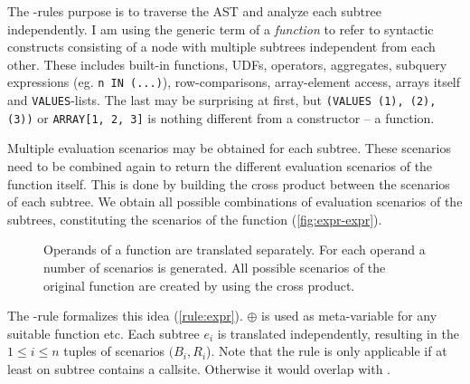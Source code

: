 The \REXPR-rules purpose is to traverse the AST and analyze each subtree independently. I am using the generic term of a \textit{function} to refer to syntactic constructs consisting of a node with multiple subtrees independent from each other. These includes built-in functions, UDFs, operators, aggregates, subquery expressions (eg. \texttt{n IN (...)}), row-comparisons, array-element access, arrays itself and \texttt{VALUES}-lists. The last may be surprising at first, but \texttt{(VALUES (1), (2), (3))} or \texttt{ARRAY[1, 2, 3]} is nothing different from a constructor -- a function.

Multiple evaluation scenarios may be obtained for each subtree. These scenarios need to be combined again to return the different evaluation scenarios of the function itself. This is done by building the cross product between the scenarios of each subtree. We obtain all possible combinations of evaluation scenarios of the subtrees, constituting the scenarios of the function (\autoref{fig:expr-expr}).

\begin{figure}[h]
    \centering
    
    \caption{Operands of a function are translated separately. For each operand a number of scenarios is generated. All possible scenarios of the original function are created by using the cross product.}
    \label{fig:expr-expr}
\end{figure}

\iffalse
$
\inferrule*[Right=(expr)]{
    \inferrule*[Left=(rec)]{ }{
        {\begin{minipage}[b]{15em}
        \texttt{(TRUE, fib($1 - 1)) ->}
        \texttt{({}, {(TRUE, fib($1 - 1))})}
        \end{minipage}}
    }\\
    \inferrule*[Right=(rec)]{ }{
        {\begin{minipage}[b]{15em}
        \texttt{(TRUE, fib($1 - 2)) ->}
        \texttt{({}, {(TRUE, fib($1 - 2))})}
        \end{minipage}}
    }
}{
    {\begin{minipage}[b]{25em}
    \texttt{(TRUE, fib($1 - 1) + fib($1 - 2)) ->}
    \texttt{({}, {(TRUE AND TRUE AND TRUE, fib($1 - 1) + fib($1 - 2))})}
    \end{minipage}}
}
$
\fi

The \REXPR-rule formalizes this idea (\autoref{rule:expr}). $\oplus$ is used as meta-variable for any suitable function etc. Each subtree $e_i$ is translated independently, resulting in the $1 \leq i \leq n$ tuples of scenarios $(B_i, R_i$). Note that the rule is only applicable if at least on subtree contains a callsite. Otherwise it would overlap with \RBASE.

